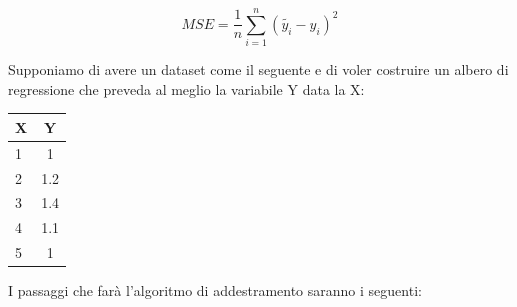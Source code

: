 \documentclass[a4paper, 11pt, oneside]{report}
\begin{document}
                \[
                    MSE = \frac{1}{n}\sum_{i=1}^{n}(\tilde{y_i} - y_i)^2
                \]
                \newpage
                \par \noindent Supponiamo di avere un dataset come il seguente e di voler costruire un albero di regressione
                che preveda al meglio la variabile Y data la X:
                \begin{center}
                    \begin{tabular}{| l | c |}      %
                        \hline                      %
                        X & Y\\                     %
                        \hline
                        1 & 1\\
                        \hline
                        2 & 1.2\\
                        \hline
                        3 & 1.4\\
                        \hline
                        4 & 1.1\\
                        \hline
                        5 & 1\\
                        \hline
                    \end{tabular}
                \end{center}
                \medskip
                \par \noindent I passaggi che farà l'algoritmo di addestramento saranno i seguenti:
\end{document}
